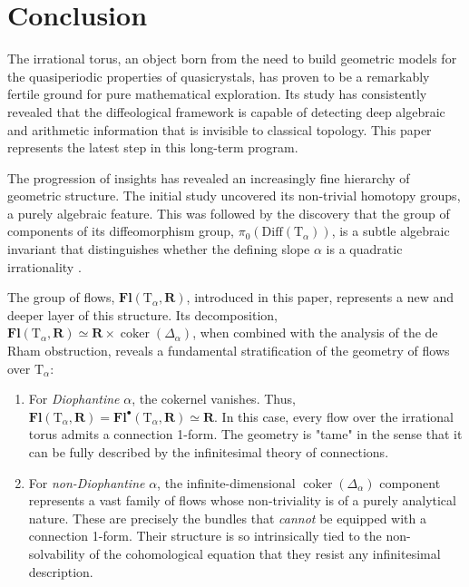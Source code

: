 \documentclass[10pt,letterpaper,reqno]{amsart}
\theoremstyle{article}
\newcommand{\1}{{\hat 1}}
\newcommand{\0}{{\hat 0}}
\newcommand{\RR}{\mathbf R}
\def \T{\mathrm T}
\newcommand{\coker}{\operatorname{coker}}
\newcommand{\Diff}{\mathrm{Diff}}
\DeclareMathOperator{\Fb}{\boldsymbol{\mathsf{Fl}}}
\renewcommand{\Fb}{\mathbf{Fl}}
\begin{document}
    
    \section{Conclusion}
    
    The irrational torus, an object born from the need to build geometric models for the quasiperiodic properties of quasicrystals, has proven to be a remarkably fertile ground for pure mathematical exploration. Its study has consistently revealed that the diffeological framework is capable of detecting deep algebraic and arithmetic information that is invisible to classical topology. This paper represents the latest step in this long-term program.
    
    The progression of insights has revealed an increasingly fine hierarchy of geometric structure. The initial study uncovered its non-trivial homotopy groups, a purely algebraic feature. This was followed by the discovery that the group of components of its diffeomorphism group, $\pi_0(\Diff(\T_\alpha))$, is a subtle algebraic invariant that distinguishes whether the defining slope $\alpha$ is a quadratic irrationality \cite{DIZ83, IZL90}.
    
    The group of flows, $\Fb(\T_\alpha, \RR)$, introduced in this paper, represents a new and deeper layer of this structure. Its decomposition, $\Fb(\T_\alpha, \RR) \simeq \RR \times \coker(\Delta_\alpha)$, when combined with the analysis of the de Rham obstruction, reveals a fundamental stratification of the geometry of flows over $\T_\alpha$:
    
    \begin{enumerate}
      \item For \emph{Diophantine} $\alpha$, the cokernel vanishes. Thus, $\Fb(\T_\alpha,\RR) = \Fb^\bullet(\T_\alpha,\RR) \simeq \RR$. In this case, every flow over the irrational torus admits a connection 1-form. The geometry is "tame" in the sense that it can be fully described by the infinitesimal theory of connections.
      
      \item For \emph{non-Diophantine} $\alpha$, the infinite-dimensional $\coker(\Delta_\alpha)$ component represents a vast family of flows whose non-triviality is of a purely analytical nature. These are precisely the bundles that \emph{cannot} be equipped with a connection 1-form. Their structure is so intrinsically tied to the non-solvability of the cohomological equation that they resist any infinitesimal description.
    \end{enumerate}
    
\end{document}
